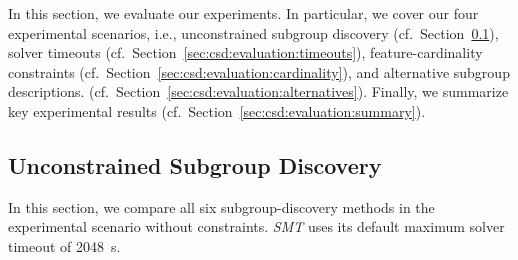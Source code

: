 \documentclass{article}
\theoremstyle{definition}
\begin{document}
In this section, we evaluate our experiments.
In particular, we cover our four experimental scenarios, i.e., unconstrained subgroup discovery (cf.~Section~\ref{sec:csd:evaluation:unconstrained}), solver timeouts (cf.~Section~\ref{sec:csd:evaluation:timeouts}), feature-cardinality constraints (cf.~Section~\ref{sec:csd:evaluation:cardinality}), and alternative subgroup descriptions. (cf.~Section~\ref{sec:csd:evaluation:alternatives}).
Finally, we summarize key experimental results (cf.~Section~\ref{sec:csd:evaluation:summary}).

\subsection{Unconstrained Subgroup Discovery}
\label{sec:csd:evaluation:unconstrained}

In this section, we compare all six subgroup-discovery methods in the experimental scenario without constraints.
\emph{SMT} uses its default maximum solver timeout of 2048~s.
\end{document}
